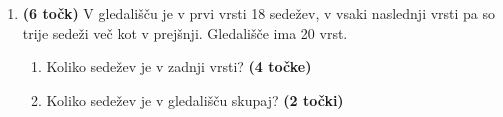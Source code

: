 \documentclass[a4paper,12pt]{article}
\begin{document}
\begin{enumerate}
	\item \textbf{(6 točk)} V gledališču je v prvi vrsti 18 sedežev, v vsaki naslednji vrsti pa so trije sedeži več kot v prejšnji. Gledališče ima 20 vrst.
	\begin{enumerate}
		\item Koliko sedežev je v zadnji vrsti? \textbf{(4 točke)}
		\item Koliko sedežev je v gledališču skupaj? \textbf{(2 točki)}
	\end{enumerate}
\end{enumerate}
\end{document}
